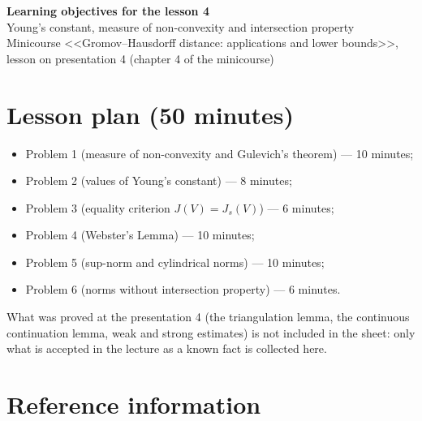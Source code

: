 \documentclass[a4paper,12pt]{report}
\begin{document}
\begin{center}
{\Large\bfseries Learning objectives for the lesson \textup{4}}\\[2mm]
{\large Young's constant, measure of non-convexity and intersection property}\\[1mm]
{\small Minicourse <<Gromov--Hausdorff distance: applications and lower bounds>>, lesson on presentation \textup{4} (chapter \textup{4} of the minicourse)}
\end{center}

\section*{Lesson plan (\textup{50} minutes)}

\begin{itemize}[leftmargin=*]
\item Problem \textup{1} (measure of non-convexity and Gulevich's theorem) --- \textup{10} minutes\textup{;}
\item Problem \textup{2} (values of Young's constant) --- \textup{8} minutes\textup{;}
\item Problem \textup{3} (equality criterion $J(V) = J_s(V)$) --- \textup{6} minutes\textup{;}
\item Problem \textup{4} (Webster's Lemma) --- \textup{10} minutes\textup{;}
\item Problem \textup{5} (sup-norm and cylindrical norms) --- \textup{10} minutes\textup{;}
\item Problem \textup{6} (norms without intersection property) --- \textup{6} minutes.
\end{itemize}

What was proved at the presentation \textup{4} \textup{(}the triangulation lemma, the continuous continuation lemma, weak and strong estimates\textup{)} is not included in the sheet\textup{:} only what is accepted in the lecture as a known fact is collected here.
\section*{Reference information}
\end{document}
